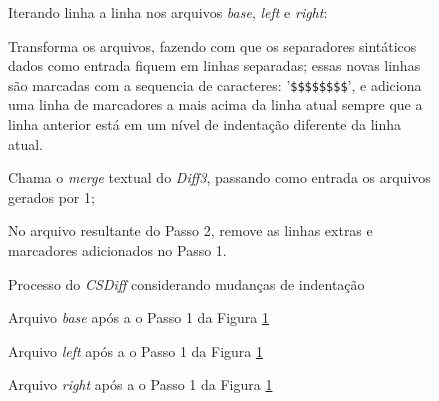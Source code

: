 \begin{figure}[ht]
	\begin{center}
		\begin{compactenum}[(1)]
			\item Iterando linha a linha nos arquivos \emph{base}, \emph{left} e \emph{right}:
			\begin{compactenum}
				\item Transforma os arquivos, fazendo com que os separadores sintáticos
				dados como entrada fiquem em linhas separadas; essas novas linhas são marcadas com a sequencia de caracteres:
				'\verb|$$$$$$$$|', e adiciona uma linha de marcadores a mais acima da linha atual
				sempre que a linha anterior está em um nível de
				indentação diferente da linha atual.
			\end{compactenum}
			\item Chama o \emph{merge} textual do \emph{Diff3}, passando como entrada os arquivos gerados por 1;
			\item No arquivo resultante do Passo 2, remove as linhas extras e marcadores adicionados no Passo 1.
		\end{compactenum}
	\end{center}
	\caption{Processo do \emph{CSDiff} considerando mudanças de indentação}\label{csdiff_process_indentation}
\end{figure}


\begin{figure}[ht]
	\begin{center}
		
		\caption{Arquivo \emph{base} após a o Passo 1 da Figura
			\ref{csdiff_process_indentation}}\label{base_marcadores_indentacao}
	\end{center}
\end{figure}

\begin{figure}[ht]
	\begin{center}
		
		\caption{Arquivo \emph{left} após a o Passo 1 da Figura
			\ref{csdiff_process_indentation}}\label{left_marcadores_indentacao}
	\end{center}
\end{figure}

\begin{figure}[ht]
	\begin{center}
		
		\caption{Arquivo \emph{right} após a o Passo 1 da Figura
			\ref{csdiff_process_indentation}}\label{right_marcadores_indentacao}
	\end{center}
\end{figure}

